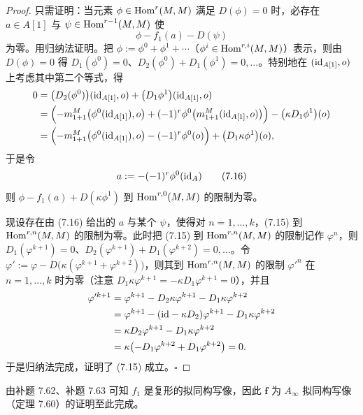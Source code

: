 \begin{proof}
只需证明：当元素 $\phi\in\operatorname{Hom}^{r}(M,M)$ 满足 $D(\phi)=0$ 时，必存在 $a\in A[1]$ 与 $\psi\in\operatorname{Hom}^{r-1}(M,M)$ 使
\begin{equation}
  \phi-f_{1}(a)-D(\psi) \tag{7.15}
\end{equation}
为零。用归纳法证明。把 $\phi:=\phi^{0}+\phi^{1}+\cdots$（$\phi^{i}\in\operatorname{Hom}^{r,i}(M,M)$）表示，则由 $D(\phi)=0$ 得 $D_{1}(\phi^{0})=0$、$D_{2}(\phi^{0})+D_{1}(\phi^{1})=0,\dots$。特别地在 $(\mathrm{id}_{A[1]},o)$ 上考虑其中第二个等式，得
\begin{align*}
  0&=\bigl(D_{2}(\phi^{0})\bigr)(\mathrm{id}_{A[1]},o)+\bigl(D_{1}\phi^{1}\bigr)(\mathrm{id}_{A[1]},o)\\
  &=\Bigl(-m_{1+1}^{M}\bigl(\phi^{0}(\mathrm{id}_{A[1]}),o\bigr)+(-1)^{r}\phi^{0}\bigl(m_{1+1}^{M}(\mathrm{id}_{A[1]},o)\bigr)\Bigr)-\bigl(\kappa D_{1}\phi^{1}\bigr)(o)\\
  &=\Bigl(-m_{1+1}^{M}\bigl(\phi^{0}(\mathrm{id}_{A[1]}),o\bigr)-(-1)^{r}\phi^{0}(o)\Bigr)+\bigl(D_{1}\kappa\phi^{1}\bigr)(o),
\end{align*}
于是令
\begin{equation}
  a:=-(-1)^{r}\phi^{0}(\mathrm{id}_{A}) \tag{7.16}
\end{equation}
则 $\phi-f_{1}(a)+D(\kappa\phi^{1})$ 到 $\operatorname{Hom}^{r,0}(M,M)$ 的限制为零。

现设存在由 (7.16) 给出的 $a$ 与某个 $\psi$，使得对 $n=1,\dots,k$，(7.15) 到 $\operatorname{Hom}^{r,n}(M,M)$ 的限制为零。此时把 (7.15) 到 $\operatorname{Hom}^{r,n}(M,M)$ 的限制记作 $\varphi^{n}$，则 $D_{1}(\varphi^{k+1})=0$、$D_{2}(\varphi^{k+1})+D_{1}(\varphi^{k+2})=0,\dots$。令 $\varphi':=\varphi-D\bigl(\kappa(\varphi^{k+1}+\varphi^{k+2})\bigr)$，则其到 $\operatorname{Hom}^{r,n}(M,M)$ 的限制 $\varphi'^{n}$ 在 $n=1,\dots,k$ 时为零（注意 $D_{1}\kappa\varphi^{k+1}=-\kappa D_{1}\varphi^{k+1}=0$），并且
\begin{align*}
  \varphi'^{k+1}&=\varphi^{k+1}-D_{2}\kappa\varphi^{k+1}-D_{1}\kappa\varphi^{k+2}\\
  &=\varphi^{k+1}-(\mathrm{id}-\kappa D_{2})\varphi^{k+1}-D_{1}\kappa\varphi^{k+2}\\
  &=\kappa D_{2}\varphi^{k+1}-D_{1}\kappa\varphi^{k+2}\\
  &=\kappa\bigl(-D_{1}\varphi^{k+2}+D_{1}\varphi^{k+2}\bigr)=0.
\end{align*}
于是归纳法完成，证明了 (7.15) 成立。\hfill$\square$
\end{proof}

由补题 7.62、补题 7.63 可知 $f_{1}$ 是复形的拟同构写像，因此 $\mathbf f$ 为 $A_\infty$ 拟同构写像（定理 7.60）的证明至此完成。

